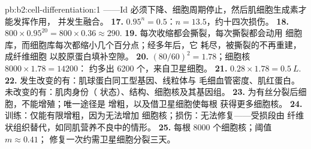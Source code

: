 \begin{solution}{pb:b2:cell-differentiation:1}
——Id 必须下降、细胞周期停止，然后肌细胞生成素才能发挥作用，
并发生融合。
\textbf{17.} $0.95^{n} = 0.5$：$n = 13.5$，约十四次损伤。
\textbf{18.} $800\times 0.95^{20} = 800\times 0.36 \approx 290$.
\textbf{19.} 每次收缩都会撕裂，每次撕裂都会动用
细胞库，而细胞库每次都缩小几个百分点；经多年后，它
耗尽，被撕裂的不再重建，成纤维细胞
以胶原蛋白填补空隙。
\textbf{20.} $(80/60)^{2} = 1.78$；细胞核 $8000\times 1.78 = \num{14200}$：
约多出 \num{6200} 个，来自卫星细胞。
\textbf{21.} $0.28\times 1.78 = \qty{0.5}{L}$.
\textbf{22.} 发生改变的有：肌球蛋白同工型基因、线粒体与
毛细血管密度、肌红蛋白。未改变的有：肌肉身份（
状态）、结构、细胞核及其基因组。
\textbf{23.} 为有丝分裂后细胞，不能增殖；唯一途径是
增粗，以及借卫星细胞使每根
获得更多细胞核。
\textbf{24.} 训练：仅能有限增粗，因为无法增加
细胞核；损伤：无法修复——受损段由
纤维状组织替代，如同肌营养不良中的情形。
\textbf{25.} 每根 \num{8000} 个细胞核；阈值 $m \approx 0.41$；
修复一次约需卫星细胞分裂三天。
\end{solution}
